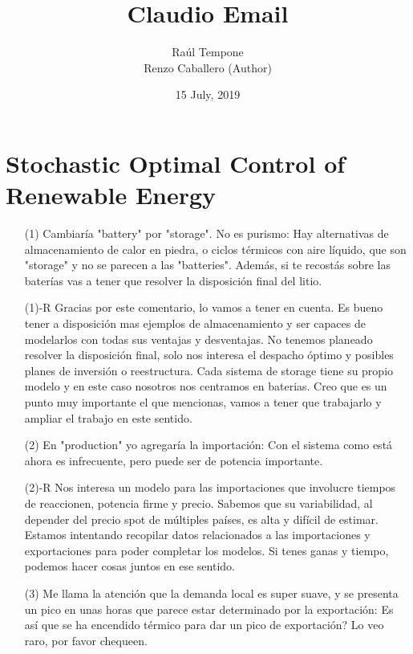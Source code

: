 \documentclass[12pt]{article}
\theoremstyle{definition}
\theoremstyle{remark}
\begin{document}
\title{Claudio Email}
\author{Ra\'ul Tempone\\
Renzo Caballero (Author)}
\date{15 July, 2019}
\maketitle

\section*{Stochastic Optimal Control of Renewable Energy}

\begin{enumerate}

\item[(1)] Cambiar\'ia "battery" por "storage". No es purismo: Hay alternativas de almacenamiento de calor en piedra, o ciclos t\'ermicos con aire l\'iquido, que son "storage" y no se parecen a las "batteries". Además, si te recostás sobre las bater\'ias vas a tener que resolver la disposici\'on final del litio.

\item[(1)-R] Gracias por este comentario, lo vamos a tener en cuenta. Es bueno tener a disposici\'on mas ejemplos de almacenamiento y ser capaces de modelarlos con todas sus ventajas y desventajas. No tenemos planeado resolver la disposici\'on final, solo nos interesa el despacho \'optimo y posibles planes de inversi\'on o reestructura. Cada sistema de storage tiene su propio modelo y en este caso nosotros nos centramos en baterias. Creo que es un punto muy importante el que mencionas, vamos a tener que trabajarlo y ampliar el trabajo en este sentido.

\item[(2)] En "production" yo agregar\'ia la importaci\'on: Con el sistema como est\'a ahora es infrecuente, pero puede ser de potencia importante.

\item[(2)-R] Nos interesa un modelo para las importaciones que involucre tiempos de reaccionen, potencia firme y precio. Sabemos que su variabilidad, al depender del precio spot de m\'ultiples pa\'ises, es alta y dif\'icil de estimar. Estamos intentando recopilar datos relacionados a las importaciones y exportaciones para poder completar los modelos. Si tenes ganas y tiempo, podemos hacer cosas juntos en ese sentido.

\item[(3)] Me llama la atenci\'on que la demanda local es super suave, y se presenta un pico en unas horas que parece estar determinado por la exportaci\'on: Es as\'i que se ha encendido t\'ermico para dar un pico de exportaci\'on? Lo veo raro, por favor chequeen.


\end{enumerate}
\end{document}
